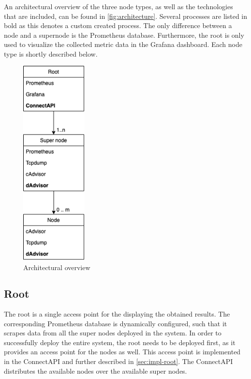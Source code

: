 \noindent
An architectural overview of the three node types, as well as the technologies that are included, can be found in \autoref{fig:architecture}. Several processes are listed in bold as this denotes a custom created process. The only difference between a node and a supernode is the Prometheus database. Furthermore, the root is only used to visualize the collected metric data in the Grafana dashboard. Each node type is shortly described below.

\begin{figure}[ht]
    \centering
    \includegraphics[width=0.3\textwidth]{gfx/architecture.png}
    \caption{Architectural overview}
    \label{fig:architecture}
\end{figure}

\subsection{Root} \label{sec:root}
The root is a single access point for the displaying the obtained results. The corresponding Prometheus database is dynamically configured, such that it scrapes data from all the super nodes deployed in the system. 
In order to successfully deploy the entire system, the root needs to be deployed first, as it provides an access point for the nodes as well. This access point is implemented in the ConnectAPI and further described in \autoref{sec:impl-root}. The ConnectAPI distributes the available nodes over the available super nodes.

